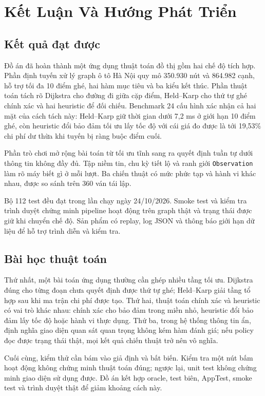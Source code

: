 \chapter{Kết Luận Và Hướng Phát Triển}

\section{Kết quả đạt được}

Đồ án đã hoàn thành một ứng dụng thuật toán đồ thị gồm hai chế độ tích hợp. Phần
định tuyến xử lý graph ô tô Hà Nội quy mô 350.930 nút và 864.982 cạnh, hỗ trợ
tối đa 10 điểm ghé, hai hàm mục tiêu và ba kiểu kết thúc. Phần thuật toán tách
rõ Dijkstra cho đường đi giữa cặp điểm, Held--Karp cho thứ tự ghé chính xác và
hai heuristic để đối chiếu. Benchmark 24 cấu hình xác nhận cả hai mặt của cách
tách này: Held--Karp giữ thời gian dưới 7,2 ms ở giới hạn 10 điểm ghé, còn
heuristic đổi bảo đảm tối ưu lấy tốc độ với cái giá đo được là tới 19,53\% chi
phí dư thừa khi tuyến bị ràng buộc điểm cuối.

Phần trò chơi mở rộng bài toán từ tối ưu tĩnh sang ra quyết định tuần tự dưới
thông tin không đầy đủ. Tập niềm tin, chu kỳ tiết lộ và ranh giới
\texttt{Observation} làm rõ máy biết gì ở mỗi lượt. Ba chiến thuật có mức phức
tạp và hành vi khác nhau, được so sánh trên 360 ván tái lập.

Bộ 112 test đều đạt trong lần chạy ngày 24/10/2026. Smoke test và kiểm tra trình
duyệt chứng minh pipeline hoạt động trên graph thật và trạng thái được giữ khi
chuyển chế độ. Sản phẩm có replay, log JSON và thông báo giới hạn dữ liệu để hỗ
trợ trình diễn và kiểm tra.

\section{Bài học thuật toán}

Thứ nhất, một bài toán ứng dụng thường cần ghép nhiều tầng tối ưu. Dijkstra đúng
cho từng đoạn chưa quyết định được thứ tự ghé; Held--Karp giải tầng tổ hợp sau khi
ma trận chi phí được tạo. Thứ hai, thuật toán chính xác và heuristic có vai trò
khác nhau: chính xác cho bảo đảm trong miền nhỏ, heuristic đổi bảo đảm lấy tốc độ
hoặc hành vi thực dụng. Thứ ba, trong hệ thống thông tin ẩn, định nghĩa giao diện
quan sát quan trọng không kém hàm đánh giá; nếu policy đọc được trạng thái thật,
mọi kết quả chiến thuật trở nên vô nghĩa.

Cuối cùng, kiểm thử cần bám vào giả định và bất biến. Kiểm tra một nút bấm hoạt
động không chứng minh thuật toán đúng; ngược lại, unit test không chứng minh giao
diện sử dụng được. Đồ án kết hợp oracle, test biên, AppTest, smoke test và trình
duyệt thật để giảm khoảng cách này.

